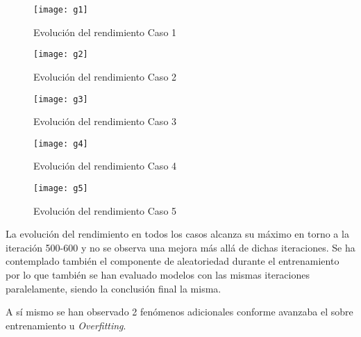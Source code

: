 \begin{figure}[htb]
\centering
\texttt{[image: g1]}
\caption[Evolución del rendimiento Caso 1]{Evolución del rendimiento Caso 1}
\end{figure}

\begin{figure}[htb]
\centering
\texttt{[image: g2]}
\caption[Evolución del rendimiento Caso 2]{Evolución del rendimiento Caso 2}
\end{figure}

\begin{figure}[htb]
\centering
\texttt{[image: g3]}
\caption[Evolución del rendimiento Caso 3]{Evolución del rendimiento Caso 3}
\end{figure}

\begin{figure}[htb]
\centering
\texttt{[image: g4]}
\caption[Evolución del rendimiento Caso 4]{Evolución del rendimiento Caso 4}
\end{figure}

\begin{figure}[htb]
\centering
\texttt{[image: g5]}
\caption[Evolución del rendimiento Caso 5]{Evolución del rendimiento Caso 5}
\end{figure}

La evolución del rendimiento en todos los casos alcanza su máximo en torno a la iteración 500-600 y no se observa una mejora más allá de dichas iteraciones. Se ha contemplado también el componente de aleatoriedad durante el entrenamiento por lo que también se han evaluado modelos con las mismas iteraciones paralelamente, siendo la conclusión final la misma.

\clearpage

A sí mismo se han observado 2 fenómenos adicionales conforme avanzaba el sobre entrenamiento u \emph{Overfitting}. 

